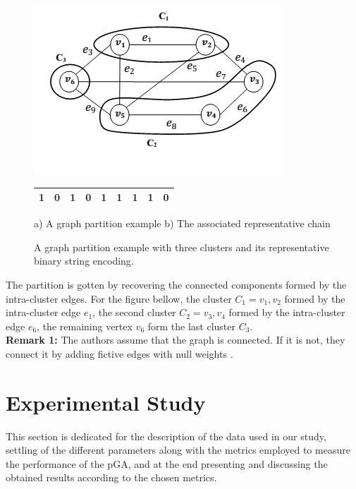 \documentclass[review]{elsarticle}
\begin{document}
\begin{figure}[H]
	\begin{minipage}{.5\textwidth}
		\centering
		\includegraphics[scale=0.6]{figurePaper/figure2.png}
		\label{fig}
	\end{minipage}
	\begin{minipage}{.5\textwidth}\centering
		\begin{tabular}{|c|c|c|c|c|c|c|c|c|}
			\hline
			1 & 0 & 1 & 0 & 1 & 1 & 1 & 1 & 0 \\
			\hline
		\end{tabular}	
	\end{minipage}
	\begin{center}a) A graph partition example \hspace*{1.cm}   b) The associated representative chain \end{center}
	\caption{A graph partition example with three clusters and its representative binary string encoding.}
	\label{codageBinaire}
\end{figure}

The partition is gotten by recovering the connected components formed by the intra-cluster edges. For the figure bellow, the cluster $C_1={v_1,v_2}$ formed by the intra-cluster edge $e_1$, the second cluster $C_2={v_3,v_4}$ formed by the intra-cluster edge $e_6$, the remaining vertex $v_6$ form the last cluster $C_3$.\\

\noindent \textbf{Remark 1:} The authors assume that the graph is connected. If it is not, they connect it by adding fictive edges with null weights \cite{boulif_atif_2006}.


\section{Experimental Study}
This section is dedicated for the description of the data used in our study, settling of the different parameters along with the metrics employed to measure the performance of the pGA, and at the end presenting and discussing the obtained results according to the chosen metrics.
\end{document}
